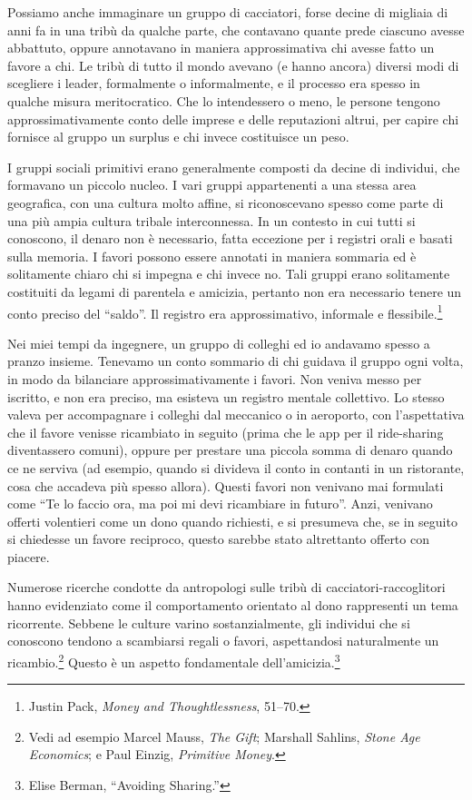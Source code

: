 \documentclass[
  a5paper,
  smalldemyvopaper,10pt,twoside,onecolumn,openright,extrafontsizes,hidelinks]{memoir}
\begin{document}
Possiamo anche immaginare un gruppo di cacciatori, forse decine di
migliaia di anni fa in una tribù da qualche parte, che contavano quante
prede ciascuno avesse abbattuto, oppure annotavano in maniera
approssimativa chi avesse fatto un favore a chi. Le tribù di tutto il
mondo avevano (e hanno ancora) diversi modi di scegliere i leader,
formalmente o informalmente, e il processo era spesso in qualche misura
meritocratico. Che lo intendessero o meno, le persone tengono
approssimativamente conto delle imprese e delle reputazioni altrui, per
capire chi fornisce al gruppo un surplus e chi invece costituisce un
peso.

I gruppi sociali primitivi erano generalmente composti da decine di
individui, che formavano un piccolo nucleo. I vari gruppi appartenenti a
una stessa area geografica, con una cultura molto affine, si
riconoscevano spesso come parte di una più ampia cultura tribale
interconnessa. In un contesto in cui tutti si conoscono, il denaro non è
necessario, fatta eccezione per i registri orali e basati sulla memoria.
I favori possono essere annotati in maniera sommaria ed è solitamente
chiaro chi si impegna e chi invece no. Tali gruppi erano solitamente
costituiti da legami di parentela e amicizia, pertanto non era
necessario tenere un conto preciso del ``saldo''. Il registro era
approssimativo, informale e flessibile.\footnote{Justin Pack,
  \emph{Money and Thoughtlessness}, 51--70.}

Nei miei tempi da ingegnere, un gruppo di colleghi ed io andavamo spesso
a pranzo insieme. Tenevamo un conto sommario di chi guidava il gruppo
ogni volta, in modo da bilanciare approssimativamente i favori. Non
veniva messo per iscritto, e non era preciso, ma esisteva un registro
mentale collettivo. Lo stesso valeva per accompagnare i colleghi dal
meccanico o in aeroporto, con l'aspettativa che il favore venisse
ricambiato in seguito (prima che le app per il ride-sharing diventassero
comuni), oppure per prestare una piccola somma di denaro quando ce ne
serviva (ad esempio, quando si divideva il conto in contanti in un
ristorante, cosa che accadeva più spesso allora). Questi favori non
venivano mai formulati come ``Te lo faccio ora, ma poi mi devi
ricambiare in futuro''. Anzi, venivano offerti volentieri come un dono
quando richiesti, e si presumeva che, se in seguito si chiedesse un
favore reciproco, questo sarebbe stato altrettanto offerto con piacere.

Numerose ricerche condotte da antropologi sulle tribù di
cacciatori-raccoglitori hanno evidenziato come il comportamento
orientato al dono rappresenti un tema ricorrente. Sebbene le culture
varino sostanzialmente, gli individui che si conoscono tendono a
scambiarsi regali o favori, aspettandosi naturalmente un
ricambio.\footnote{Vedi ad esempio Marcel Mauss, \emph{The Gift};
  Marshall Sahlins, \emph{Stone Age Economics}; e Paul Einzig,
  \emph{Primitive Money}.} Questo è un aspetto fondamentale
dell'amicizia.\footnote{Elise Berman, ``Avoiding Sharing.''}
\end{document}
